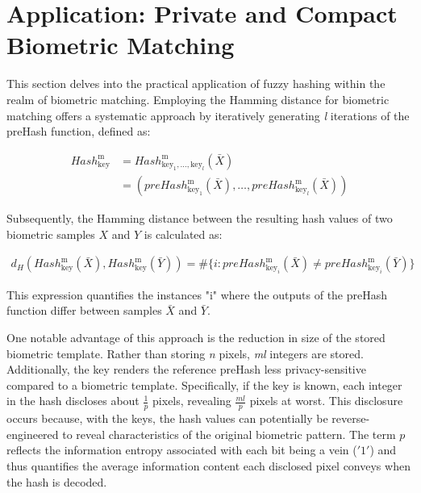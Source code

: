 \newpage
\section{Application: Private and Compact Biometric Matching}
\label{Application: Private and Compact Biometric Matching}

This section delves into the practical application of fuzzy hashing within the realm of biometric matching. Employing the Hamming distance for biometric matching offers a systematic approach by iteratively generating \textit{l} iterations of the preHash function, defined as:

\begin{equation}
    \begin{aligned}
        Hash_{\text{key}}^\text{m} &= Hash_{\text{key}_1, \ldots, \text{key}_l}^\text{m}(\bar{X})\\
        &= (preHash_{\text{key}_1}^\text{m}(\bar{X}), \ldots, preHash_{\text{key}_l}^\text{m}(\bar{X}))
    \end{aligned}
\end{equation}

Subsequently, the Hamming distance between the resulting hash values of two biometric samples \(X\) and \(Y\) is calculated as:

\begin{equation}
    \begin{aligned}
        \label{eq:HammingDist}
        d_H(Hash_{\text{key}}^\text{m}(\bar{X}), Hash_{\text{key}}^\text{m}(\bar{Y})) = \# \{i: preHash_{\text{key}_i}^\text{m}(\bar{X}) \neq preHash_{\text{key}_i}^\text{m}(\bar{Y})\}
    \end{aligned}
\end{equation}

This expression quantifies the instances "i" where the outputs of the preHash function differ between samples \(\bar{X}\) and \(\bar{Y}\).

One notable advantage of this approach is the reduction in size of the stored biometric template. Rather than storing \textit{n} pixels, \textit{ml} integers are stored. Additionally, the key renders the reference preHash less privacy-sensitive compared to a biometric template. Specifically, if the key is known, each integer in the hash discloses about \(\frac{1}{p}\) pixels, revealing \(\frac{ml}{p}\) pixels at worst. This disclosure occurs because, with the keys, the hash values can potentially be reverse-engineered to reveal characteristics of the original biometric pattern. The term \(p\)​ reflects the information entropy associated with each bit being a vein (\('1'\)) and thus quantifies the average information content each disclosed pixel conveys when the hash is decoded.

